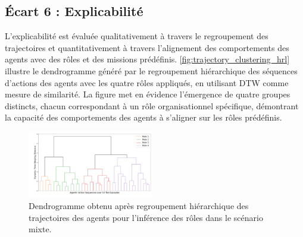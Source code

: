 \subsection{Écart 6 : Explicabilité}
\label{subsec:gap_explainability}

L'explicabilité est évaluée qualitativement à travers le regroupement des trajectoires et quantitativement à travers l'alignement des comportements des agents avec des rôles et des missions prédéfinis.
\noindent \autoref{fig:trajectory_clustering_hrl} illustre le dendrogramme généré par le regroupement hiérarchique des séquences d'actions des agents avec les quatre rôles appliqués, en utilisant DTW comme mesure de similarité. La figure met en évidence l'émergence de quatre groupes distincts, chacun correspondant à un rôle organisationnel spécifique, démontrant la capacité des comportements des agents à s'aligner sur les rôles prédéfinis.

\begin{figure}[h!]
  \centering
  \includegraphics[width=0.49\textwidth]{figures/role_hierarchical_clustering.pdf}
  \caption{Dendrogramme obtenu après regroupement hiérarchique des trajectoires des agents pour l'inférence des rôles dans le scénario mixte.}
  \label{fig:trajectory_clustering_hrl}
\end{figure}

\begin{table}[h!]
  \centering
  \caption{Alignement des agents avec leurs rôles et missions.}
  \label{tab:alignment}
\end{table}

